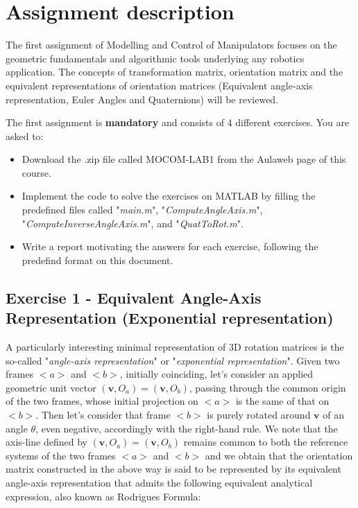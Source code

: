 \section{Assignment description}
The first assignment of Modelling and Control of Manipulators focuses on the geometric fundamentals and algorithmic tools underlying any robotics application. The concepts of transformation matrix, orientation matrix and the equivalent representations of orientation matrices (Equivalent angle-axis representation, Euler Angles and Quaternions) will be reviewed.

The first assignment is \textbf{mandatory} and consists of 4 different exercises. You are asked to:
\begin{itemize}
    \item Download the .zip file called MOCOM-LAB1 from the Aulaweb page of this course.
    \item Implement the code to solve the exercises on MATLAB by filling the predefined files called "\textit{main.m}", "\textit{ComputeAngleAxis.m}", "\textit{ComputeInverseAngleAxis.m}", and "\textit{QuatToRot.m}".
    \item Write a report motivating the answers for each exercise, following the predefind format on this document.
\end{itemize}

\subsection{Exercise 1 - Equivalent Angle-Axis Representation (Exponential representation)}
A particularly interesting minimal representation of 3D rotation matrices is the so-called "\textit{angle-axis representation}" or "\textit{exponential representation}". Given two frames $<a>$ and $<b>$, initially coinciding, let's consider an applied geometric unit vector \begin{math}(\textbf{v},O_a) = (\textbf{v},O_b)\end{math}, passing through the common origin of the two frames, whose initial projection on $<a>$ is the same of that on $<b>$. Then let's consider that frame $<b>$ is purely rotated around $\textbf{v}$ of an angle $\theta$, even negative, accordingly with the right-hand rule. We note that the axis-line defined by \begin{math}(\textbf{v},O_a) = (\textbf{v},O_b)\end{math} remains common to both the reference systems of the two frames $<a>$ and $<b>$ and we obtain that the orientation matrix constructed in the above way is said to be represented by its equivalent angle-axis representation that admits the following equivalent analytical expression, also known as Rodrigues Formula:

